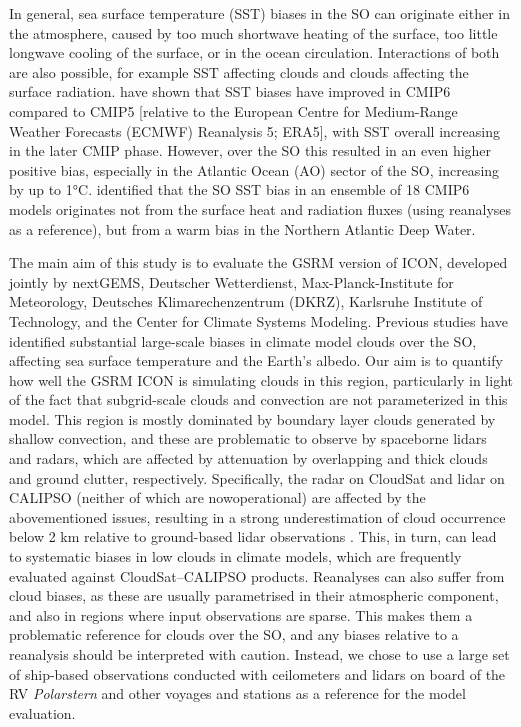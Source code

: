 \documentclass[12pt,a4paper]{article}
\begin{document}
In general, sea surface temperature (SST) biases in the SO can originate either
in the atmosphere, caused by too much shortwave heating of the surface, too
little longwave cooling of the surface, or in the ocean circulation.
Interactions of both are also possible, for example SST affecting clouds and
clouds affecting the surface radiation. \cite{zhang2023} have shown that SST
biases have improved in CMIP6 compared to CMIP5 [relative to the European
Centre for Medium-Range Weather Forecasts (ECMWF) Reanalysis 5; ERA5], with SST
overall increasing in the later CMIP phase. However, over the SO this resulted
in an even higher positive bias, especially in the Atlantic Ocean (AO) sector
of the SO, increasing by up to 1°C.  \cite{luo2023} identified that the SO SST
bias in an ensemble of 18 CMIP6 models originates not from the surface heat and
radiation fluxes (using reanalyses as a reference), but from a warm bias in the
Northern Atlantic Deep Water.

The main aim of this study is to evaluate the GSRM version of ICON, developed
jointly by nextGEMS, Deutscher Wetterdienst, Max-Planck-Institute for
Meteorology, Deutsches Klimarechenzentrum (DKRZ), Karlsruhe Institute of
Technology, and the Center for Climate Systems Modeling.  Previous studies have
identified substantial large-scale biases in climate model clouds over the SO,
affecting sea surface temperature and the Earth’s albedo. Our aim is to
quantify how well the GSRM ICON is simulating clouds in this region,
particularly in light of the fact that subgrid-scale clouds and convection are
not parameterized in this model. This region is mostly dominated by boundary
layer clouds generated by shallow convection, and these are problematic to
observe by spaceborne lidars and radars, which are affected by attenuation by
overlapping and thick clouds and ground clutter, respectively.  Specifically,
the radar on CloudSat and lidar on CALIPSO (neither of which are nowoperational) are affected by the abovementioned issues, resulting in a strong
underestimation of cloud occurrence below 2 km relative to ground-based lidar
observations \citep{mcerlich2021}.  This, in turn, can lead to systematic
biases in low clouds in climate models, which are frequently evaluated against
CloudSat--CALIPSO products. Reanalyses can also suffer from cloud biases, as
these are usually parametrised in their atmospheric component, and also in
regions where input observations are sparse.  This makes them a problematic
reference for clouds over the SO, and any biases relative to a reanalysis
should be interpreted with caution. Instead, we chose to use a large set of
ship-based observations conducted with ceilometers and lidars on board of the
RV \emph{Polarstern} and other voyages and stations as a reference for the
model evaluation.
\end{document}
